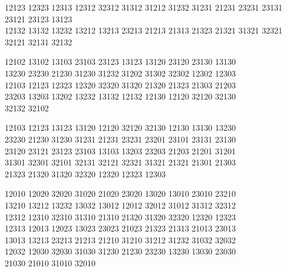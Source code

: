 \begingroup\footnotesize\ttfamily\begin{flushleft}
12123 12323 12313 12312 32312 31312 31212 31232 31231 21231 23231 23131 23121 23123 13123\\
12132 13132 13232 13212 13213 23213 21213 21313 21323 21321 31321 32321 32121 32131 32132\\
\end{flushleft}\endgroup
\begingroup\small\ttfamily\begin{flushleft}
12102 13102 13103 23103 23123 13123 13120 23120 23130 13130\\
13230 23230 21230 31230 31232 31202 31302 32302 12302 12303\\
12103 12123 12323 12320 32320 31320 21320 21323 21303 21203\\
23203 13203 13202 13232 13132 12132 12130 12120 32120 32130\\
32132 32102\\
\end{flushleft}\endgroup
\begingroup\small\ttfamily\begin{flushleft}
12103 12123 13123 13120 12120 32120 32130 12130 13130 13230\\
23230 21230 31230 31231 21231 23231 23201 23101 23131 23130\\
23120 23121 23123 23103 13103 13203 23203 21203 21201 31201\\
31301 32301 32101 32131 32121 32321 31321 21321 21301 21303\\
21323 21320 31320 32320 12320 12323 12303\\
\end{flushleft}\endgroup
\begingroup\small\ttfamily\begin{flushleft}
12010 12020 32020 31020 21020 23020 13020 13010 23010 23210\\
13210 13212 13232 13032 13012 12012 32012 31012 31312 32312\\
12312 12310 32310 31310 21310 21320 31320 32320 12320 12323\\
12313 12013 12023 13023 23023 21023 21323 21313 21013 23013\\
13013 13213 23213 21213 21210 31210 31212 31232 31032 32032\\
12032 12030 32030 31030 31230 21230 23230 13230 13030 23030\\
21030 21010 31010 32010\\
\end{flushleft}\endgroup
